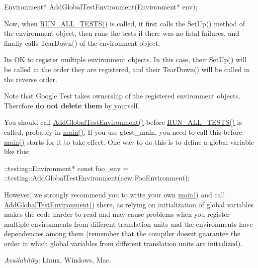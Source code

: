 \begin{DoxyCode}
Environment* AddGlobalTestEnvironment(Environment* env);
\end{DoxyCode}


Now, when {\ttfamily \hyperlink{gtest_8h_a853a3792807489591d3d4a2f2ff9359f}{R\+U\+N\+\_\+\+A\+L\+L\+\_\+\+T\+E\+S\+T\+S()}} is called, it first calls the {\ttfamily Set\+Up()} method of the environment object, then runs the tests if there was no fatal failures, and finally calls {\ttfamily Tear\+Down()} of the environment object.

It\textquotesingle{}s OK to register multiple environment objects. In this case, their {\ttfamily Set\+Up()} will be called in the order they are registered, and their {\ttfamily Tear\+Down()} will be called in the reverse order.

Note that Google Test takes ownership of the registered environment objects. Therefore {\bfseries do not delete them} by yourself.

You should call {\ttfamily \hyperlink{namespacetesting_a460d7b998622e332392c1e00be3a60d5}{Add\+Global\+Test\+Environment()}} before {\ttfamily \hyperlink{gtest_8h_a853a3792807489591d3d4a2f2ff9359f}{R\+U\+N\+\_\+\+A\+L\+L\+\_\+\+T\+E\+S\+T\+S()}} is called, probably in {\ttfamily \hyperlink{app_2main_8cpp_ae66f6b31b5ad750f1fe042a706a4e3d4}{main()}}. If you use {\ttfamily gtest\+\_\+main}, you need to call this before {\ttfamily \hyperlink{app_2main_8cpp_ae66f6b31b5ad750f1fe042a706a4e3d4}{main()}} starts for it to take effect. One way to do this is to define a global variable like this\+:


\begin{DoxyCode}
::testing::Environment* const foo\_env = ::testing::AddGlobalTestEnvironment(new FooEnvironment);
\end{DoxyCode}


However, we strongly recommend you to write your own {\ttfamily \hyperlink{app_2main_8cpp_ae66f6b31b5ad750f1fe042a706a4e3d4}{main()}} and call {\ttfamily \hyperlink{namespacetesting_a460d7b998622e332392c1e00be3a60d5}{Add\+Global\+Test\+Environment()}} there, as relying on initialization of global variables makes the code harder to read and may cause problems when you register multiple environments from different translation units and the environments have dependencies among them (remember that the compiler doesn\textquotesingle{}t guarantee the order in which global variables from different translation units are initialized).

{\itshape Availability\+:} Linux, Windows, Mac.

